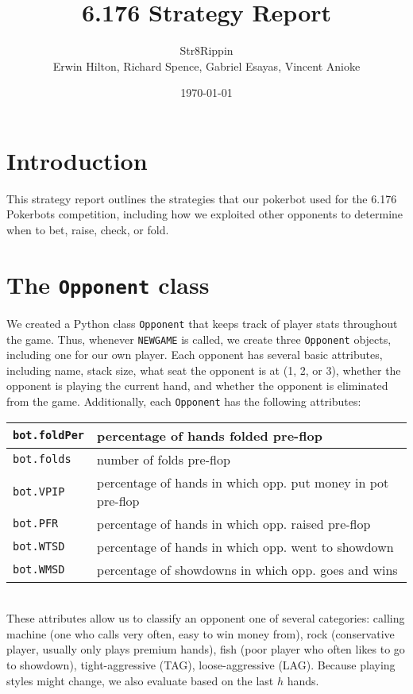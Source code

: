 \documentclass{article}
\title{6.176 Strategy Report}
\author{Str8Rippin \\
Erwin Hilton, Richard Spence, Gabriel Esayas, Vincent Anioke}
\date{\today}
\begin{document}
\maketitle

\section*{Introduction}
This strategy report outlines the strategies that our pokerbot used for the 6.176 Pokerbots competition, including how we exploited other opponents to determine when to bet, raise, check, or fold.

\section*{The \texttt{Opponent} class}
We created a Python class \texttt{Opponent} that keeps track of player stats throughout the game. Thus, whenever \texttt{NEWGAME} is called, we create three \texttt{Opponent} objects, including one for our own player. Each opponent has several basic attributes, including name, stack size, what seat the opponent is at (1, 2, or 3), whether the opponent is playing the current hand, and whether the opponent is eliminated from the game. Additionally, each \texttt{Opponent} has the following attributes: \\

\begin{tabular}{|l|l|}  \hline
\texttt{bot.foldPer} & percentage of hands folded pre-flop \\ \hline
\texttt{bot.folds} & number of folds pre-flop \\ \hline
\texttt{bot.VPIP} & percentage of hands in which opp. put money in pot pre-flop  \\ \hline
\texttt{bot.PFR} & percentage of hands in which opp. raised pre-flop \\ \hline
\texttt{bot.WTSD} & percentage of hands in which opp. went to showdown \\ \hline
\texttt{bot.WMSD} & percentage of showdowns in which opp. goes and wins \\ \hline

\end{tabular} \\

These attributes allow us to classify an opponent one of several categories: calling machine (one who calls very often, easy to win money from), rock (conservative player, usually only plays premium hands), fish (poor player who often likes to go to showdown), tight-aggressive (TAG), loose-aggressive (LAG). Because playing styles might change, we also evaluate based on the last $h$ hands. 
\end{document}
